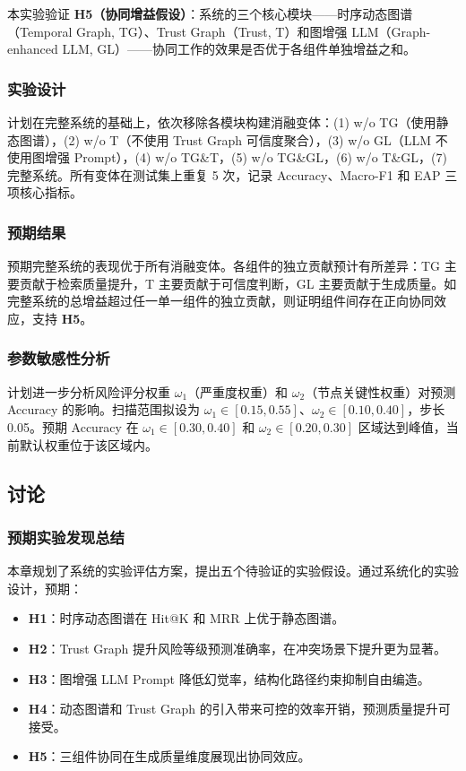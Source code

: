 本实验验证 \textbf{H5（协同增益假设）}：\projectshort 系统的三个核心模块——时序动态图谱（Temporal Graph, TG）、Trust Graph（Trust, T）和图增强 LLM（Graph-enhanced LLM, GL）——协同工作的效果是否优于各组件单独增益之和。

\subsubsection{实验设计}

计划在完整系统的基础上，依次移除各模块构建消融变体：(1) w/o TG（使用静态图谱），(2) w/o T（不使用 Trust Graph 可信度聚合），(3) w/o GL（LLM 不使用图增强 Prompt），(4) w/o TG\&T，(5) w/o TG\&GL，(6) w/o T\&GL，(7) 完整系统。所有变体在测试集上重复 5 次，记录 Accuracy、Macro-F1 和 EAP 三项核心指标。

\subsubsection{预期结果}

预期完整系统的表现优于所有消融变体。各组件的独立贡献预计有所差异：TG 主要贡献于检索质量提升，T 主要贡献于可信度判断，GL 主要贡献于生成质量。如完整系统的总增益超过任一单一组件的独立贡献，则证明组件间存在正向协同效应，支持 \textbf{H5}。

\subsubsection{参数敏感性分析}

计划进一步分析风险评分权重 $\omega_1$（严重度权重）和 $\omega_2$（节点关键性权重）对预测 Accuracy 的影响。扫描范围拟设为 $\omega_1 \in [0.15, 0.55]$、$\omega_2 \in [0.10, 0.40]$，步长 0.05。预期 Accuracy 在 $\omega_1 \in [0.30, 0.40]$ 和 $\omega_2 \in [0.20, 0.30]$ 区域达到峰值，当前默认权重位于该区域内。

\subsection{讨论}
\label{sec:exp-discussion}

\subsubsection{预期实验发现总结}

本章规划了\projectshort 系统的实验评估方案，提出五个待验证的实验假设。通过系统化的实验设计，预期：
\begin{itemize}
    \item \textbf{H1}：时序动态图谱在 Hit@K 和 MRR 上优于静态图谱。
    \item \textbf{H2}：Trust Graph 提升风险等级预测准确率，在冲突场景下提升更为显著。
    \item \textbf{H3}：图增强 LLM Prompt 降低幻觉率，结构化路径约束抑制自由编造。
    \item \textbf{H4}：动态图谱和 Trust Graph 的引入带来可控的效率开销，预测质量提升可接受。
    \item \textbf{H5}：三组件协同在生成质量维度展现出协同效应。
\end{itemize}

